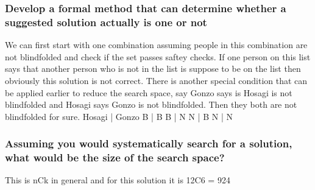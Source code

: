 \documentclass[a4paper,12pt]{article}
\begin{document}
\subsubsection*{Develop a formal method that can determine whether a suggested solution actually is one or not}
We can first start with one combination assuming people in this combination are not blindfolded and check if the set passes saftey checks.
If one person on this list says that another person who is not in the list is suppose to be on the list then obviously this solution is not correct.
There is another special condition that can be applied earlier to reduce the search space, say Gonzo says is Hosagi is not blindfolded and
Hosagi says Gonzo is not blindfolded. Then they both are not blindfolded for sure. 
\newline
  Hosagi	|	Gonzo\newline
  B		|	B\newline
  B		|	N\newline
  N		|	B\newline
  N		|	N\newline
 
 \subsubsection*{Assuming you would systematically search for a solution, what would be the size of the search space?}
 This is nCk in general and for this solution it is 12C6 = 924
\end{document}

